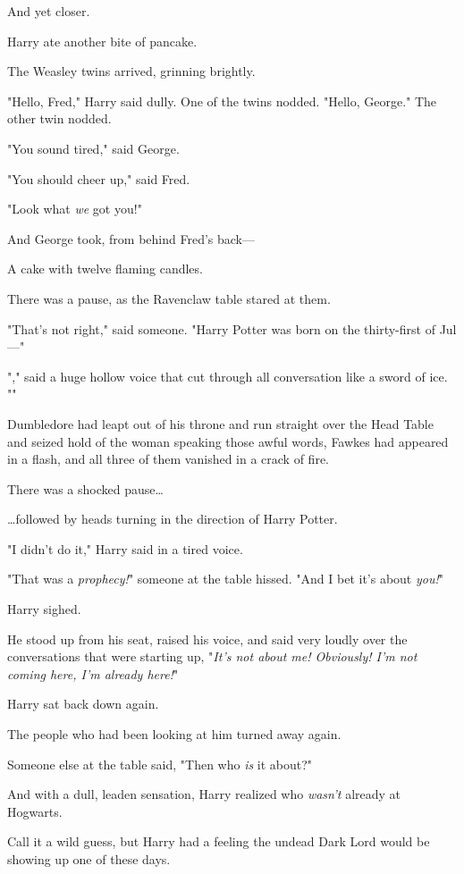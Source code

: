 And yet closer.

Harry ate another bite of pancake.

The Weasley twins arrived, grinning brightly.

"Hello, Fred," Harry said dully. One of the twins nodded. "Hello, George." The
other twin nodded.

"You sound tired," said George.

"You should cheer up," said Fred.

"Look what \emph{we} got you!"

And George took, from behind Fred's back---

A cake with twelve flaming candles.

There was a pause, as the Ravenclaw table stared at them.

"That's not right," said someone. "Harry Potter was born on the thirty-first of
Jul---"

"," said a huge hollow voice that cut through all
conversation like a sword of ice. ""

Dumbledore had leapt out of his throne and run straight over the Head Table and
seized hold of the woman speaking those awful words, Fawkes had appeared in a
flash, and all three of them vanished in a crack of fire.

There was a shocked pause{\ldots}

{\ldots}followed by heads turning in the direction of Harry Potter.

"I didn't do it," Harry said in a tired voice.

"That was a \emph{prophecy!}" someone at the table hissed. "And I bet it's
about \emph{you!}"

Harry sighed.

He stood up from his seat, raised his voice, and said very loudly over the
conversations that were starting up, "\emph{It's not about me! Obviously! I'm
not coming here, I'm already here!}"

Harry sat back down again.

The people who had been looking at him turned away again.

Someone else at the table said, "Then who \emph{is} it about?"

And with a dull, leaden sensation, Harry realized who \emph{wasn't} already at
Hogwarts.

Call it a wild guess, but Harry had a feeling the undead Dark Lord would be
showing up one of these days.

